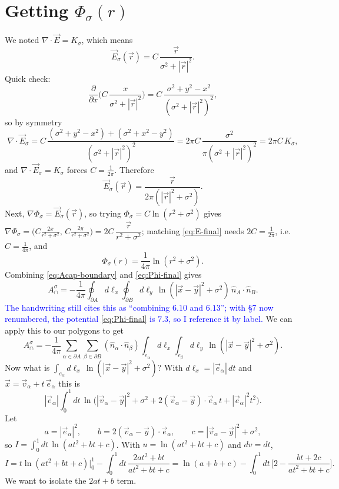 \documentclass[11pt]{article}
\numberwithin{equation}{section}
\newcommand{\vv}[1]{\vec{#1}}
\newcommand{\cam}[1]{\textcolor{blue}{#1}}
\begin{document}
\section{Getting $\Phi_\sigma(r)$}

We noted $\nabla\cdot\vv E=K_\sigma$, which means
\begin{equation}\label{eq:E-form}
  \vv E_\sigma(\vv r)=C\,\frac{\vv r}{\sigma^2+|\vv r|^2}.
\end{equation}
Quick check:
\[
  \frac{\partial}{\partial x}\Big(C\,\frac{x}{\sigma^2+|\vv r|^2}\Big)
  =C\,\frac{\sigma^2+y^2-x^2}{(\sigma^2+|\vv r|^2)^2},
\]
so by symmetry
\[
  \nabla\cdot\vv E_\sigma
  =C\,\frac{(\sigma^2+y^2-x^2)+(\sigma^2+x^2-y^2)}{(\sigma^2+|\vv r|^2)^2}
  =2\pi C\,\frac{\sigma^2}{\pi(\sigma^2+|\vv r|^2)^2}=2\pi C\,K_\sigma,
\]
and $\nabla\cdot\vv E_\sigma=K_\sigma$ forces $C=\tfrac{1}{2\pi}$. Therefore
\begin{equation}\label{eq:E-final}
  \vv E_\sigma(\vv r)=\frac{\vv r}{2\pi(|\vv r|^2+\sigma^2)}.
\end{equation}
Next, $\nabla\Phi_\sigma=\vv E_\sigma(\vv r)$, so trying $\Phi_\sigma=C\ln(r^2+\sigma^2)$ gives
$\nabla\Phi_\sigma=\big(C\tfrac{2x}{r^2+\sigma^2},\,C\tfrac{2y}{r^2+\sigma^2}\big)
=2C\,\dfrac{\vv r}{r^2+\sigma^2}$; matching \eqref{eq:E-final} needs $2C=\tfrac{1}{2\pi}$, i.e.\
$C=\tfrac{1}{4\pi}$, and
\begin{equation}\label{eq:Phi-final}
  \Phi_\sigma(r)=\frac{1}{4\pi}\ln(r^2+\sigma^2).
\end{equation}
Combining \eqref{eq:Acap-boundary} and \eqref{eq:Phi-final} gives
\begin{equation}\label{eq:Acap-log}
  A_\cap^\sigma=-\frac{1}{4\pi}\oint_{\partial A}\!d\ell_x\oint_{\partial B}\!d\ell_y\,
  \ln(|\vv x-\vv y|^2+\sigma^2)\,\hat n_A\cdot\hat n_B.
\end{equation}
\cam{The handwriting still cites this as ``combining $6.10$ and $6.13$''; with \S7 now renumbered, the
potential \eqref{eq:Phi-final} is $7.3$, so I reference it by label.}
We can apply this to our polygons to get
\begin{equation}\label{eq:Acap-edgesum}
  A_\cap^\sigma=-\frac{1}{4\pi}\sum_{\alpha\in\partial A}\sum_{\beta\in\partial B}(\hat n_\alpha\cdot\hat n_\beta)
  \int_{e_\alpha}\!d\ell_x\int_{e_\beta}\!d\ell_y\,\ln(|\vv x-\vv y|^2+\sigma^2).
\end{equation}
Now what is $\int_{e_\alpha}d\ell_x\,\ln(|\vv x-\vv y|^2+\sigma^2)$? With $d\ell_x=|\vv e_\alpha|\,dt$
and $\vv x=\vv v_\alpha+t\,\vv e_\alpha$ this is
\[
  |\vv e_\alpha|\int_0^1 dt\,\ln\!\big(|\vv v_\alpha-\vv y|^2+\sigma^2+2(\vv v_\alpha-\vv y)\cdot\vv e_\alpha\,t+|\vv e_\alpha|^2t^2\big).
\]
Let
\begin{equation}\label{eq:abc}
  a=|\vv e_\alpha|^2,\qquad b=2(\vv v_\alpha-\vv y)\cdot\vv e_\alpha,\qquad c=|\vv v_\alpha-\vv y|^2+\sigma^2,
\end{equation}
so $I=\int_0^1 dt\,\ln(at^2+bt+c)$. With $u=\ln(at^2+bt+c)$ and $dv=dt$,
\[
  I=t\ln(at^2+bt+c)\Big|_0^1-\int_0^1 dt\,\frac{2at^2+bt}{at^2+bt+c}
   =\ln(a+b+c)-\int_0^1 dt\,\Big[2-\frac{bt+2c}{at^2+bt+c}\Big].
\]
We want to isolate the $2at+b$ term.
\end{document}
